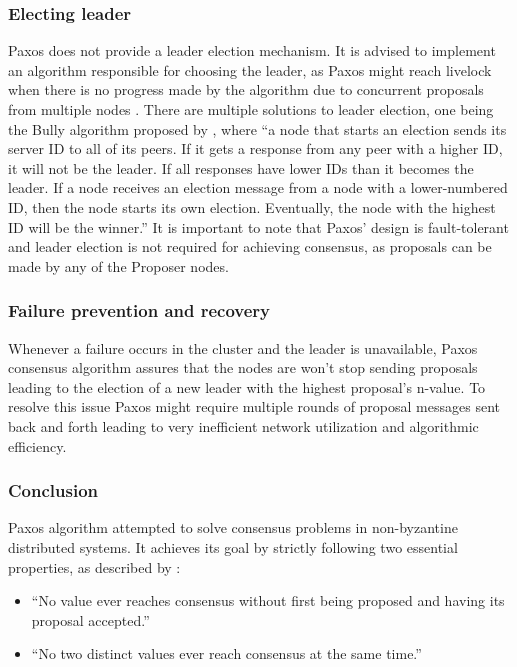 \documentclass[oneside,12pt]{book}
\begin{document}
\pagebreak
\subsubsection{Electing leader}
\par Paxos does not provide a leader election mechanism. It is advised to implement an algorithm responsible for choosing the leader, as Paxos might reach livelock when there is no progress made by the algorithm due to concurrent proposals from multiple nodes \citep{10.1145/3380787.3393681}. There are multiple solutions to leader election, one being the Bully algorithm proposed by \cite{UnderstandingPaxos}, where “a node that starts an election sends its server ID to all of its peers. If it gets a response from any peer with a higher ID, it will not be the leader. If all responses have lower IDs than it becomes the leader. If a node receives an election message from a node with a lower-numbered ID, then the node starts its own election. Eventually, the node with the highest ID will be the winner.” It is important to note that Paxos’ design is fault-tolerant and leader election is not required for achieving consensus, as proposals can be made by any of the Proposer nodes.

\subsubsection{Failure prevention and recovery}
Whenever a failure occurs in the cluster and the leader is unavailable, Paxos consensus algorithm assures that the nodes are won’t stop sending proposals leading to the election of a new leader with the highest proposal’s n-value. To resolve this issue Paxos might require multiple rounds of proposal messages sent back and forth leading to very inefficient network utilization and algorithmic efficiency.

\subsubsection{Conclusion}
Paxos algorithm attempted to solve consensus problems in non-byzantine distributed systems. It achieves its goal by strictly following two essential properties, as described by \cite{lamport2001paxos}:

\begin{itemize}
  \item “No value ever reaches consensus without first being proposed and having its proposal accepted.”
  
  \item “No two distinct values ever reach consensus at the same time.”
\end{itemize}
\end{document}
